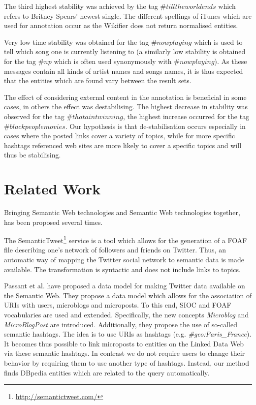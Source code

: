 \documentclass{llncs}
\begin{document}
The third highest stability was achieved by the tag $\#tilltheworldends$ which refers to Britney Spears' newest single. The different spellings of iTunes which are used for annotation occur as the Wikifier does not return normalised entities.

Very low time stability was obtained for the tag $\#nowplaying$ which is used to tell which song one is currently listening to (a similarly low stability is obtained for the tag $\#np$ which is often used synonymously with $\#nowplaying$). As these messages contain all kinds of artist names and songs names, it is thus expected that the entities which are found vary between the result sets.

The effect of considering external content in the annotation is beneficial in some cases, in others the effect was destabilising. The highest decrease in stability was observed for the tag $\#thataintwinning$, the highest increase occurred for the tag $\#blackpeoplemovies$. Our hypothesis is that de-stabilisation occurs especially in cases where the posted links cover a variety of topics, while for more specific hashtags referenced web sites are more likely to cover a specific topics and will thus be stabilising.

\section{Related Work}
\label{sect:relWork}

Bringing Semantic Web technologies and Semantic Web technologies together, has been proposed several times.

The SemanticTweet\footnote{\url{http://semantictweet.com/}} service is a tool which allows for the generation of a FOAF file describing one's network of followers and friends on Twitter. Thus, an automatic way of mapping the Twitter social network to semantic data is made available. The transformation is syntactic and does not include links to topics.

Passant et al. \cite{key:smob} have proposed a data model for making Twitter data available on the Semantic Web. They propose a data model which allows for the association of URIs with users, microblogs and microposts. To this end, SIOC and FOAF vocabularies are used and extended. Specifically, the new concepts \emph{Microblog} and \emph{MicroBlogPost} are introduced. Additionally, they propose the use of so-called semantic hashtags. The idea is to use URIs as hashtags (e.g. \emph{\#geo:Paris\_France}). It becomes thus possible to link microposts to entities on the Linked Data Web via these semantic hashtags. 
In contrast we do not require users to change their behavior by requiring them to use another type of hashtags. Instead, our method finds DBpedia entities which are related to the query automatically.
\end{document}
